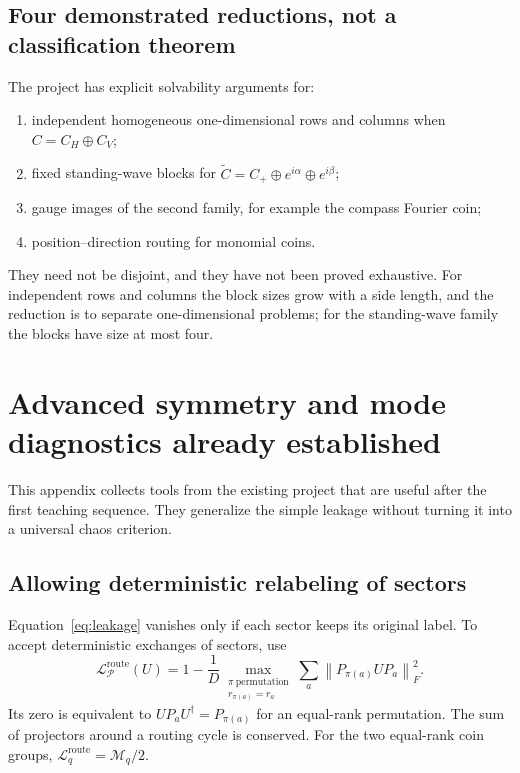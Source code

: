 \documentclass[11pt,a4paper,oneside]{report}
\newcommand{\norm}[1]{\left\lVert#1\right\rVert}
\numberwithin{equation}{chapter}
\begin{document}
\section{Four demonstrated reductions, not a classification theorem}

The project has explicit solvability arguments for:
\begin{enumerate}
\item independent homogeneous one-dimensional rows and columns when
\(C=C_H\oplus C_V\);
\item fixed standing-wave blocks for
\(\widetilde C=C_+\oplus e^{i\alpha}\oplus e^{i\beta}\);
\item gauge images of the second family, for example the compass Fourier coin;
\item position--direction routing for monomial coins.
\end{enumerate}
They need not be disjoint, and they have not been proved exhaustive.
For independent rows and columns the block sizes grow with a side
length, and the reduction is to separate one-dimensional problems;
for the standing-wave family the blocks have size at most four.


\chapter{Advanced symmetry and mode diagnostics already established}
\label{app:advanced}

This appendix collects tools from the existing project that are useful
after the first teaching sequence. They generalize the simple leakage
without turning it into a universal chaos criterion.

\section{Allowing deterministic relabeling of sectors}

Equation~\eqref{eq:leakage} vanishes only if each sector keeps its
original label. To accept deterministic exchanges of sectors, use
\begin{equation}
\boxed{
\mathcal L^{\mathrm{route}}_{\mathscr P}(U)
=1-\frac1D\max_{\substack{\pi\ \mathrm{permutation}\\r_{\pi(a)}=r_a}}
\sum_a\norm{P_{\pi(a)}UP_a}_F^2.
}
\end{equation}
Its zero is equivalent to \(UP_aU^\dagger=P_{\pi(a)}\) for an
equal-rank permutation. The sum of projectors around a routing cycle
is conserved. For the two equal-rank coin groups,
\(\mathcal L_q^{\mathrm{route}}=\mathcal M_q/2\).
\end{document}
